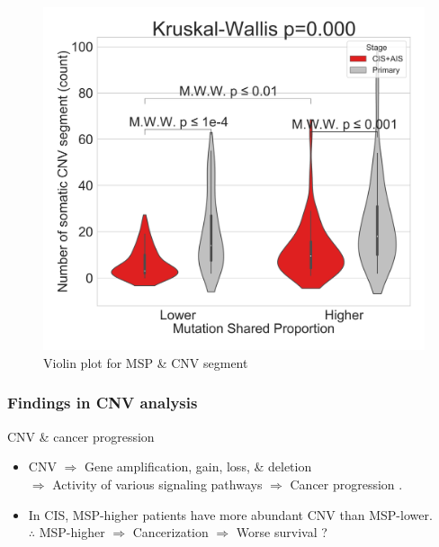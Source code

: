 \documentclass{beamer}
\begin{document}
\begin{frame}[allowframebreaks]
                    \begin{figure}
                        \includegraphics[width=0.4 \linewidth]{figures/MutationSharedProportion_CNV/Segment/Segment.BWA.Sequenza.SQC.median/Violin_Mutation Shared Proportion.pdf}
                        \caption{Violin plot for MSP \& CNV segment}
                    \end{figure}
                \end{frame}

            \begin{frame}
                \frametitle{Findings in CNV analysis}

                \begin{block}{CNV \& cancer progression}
                    \begin{itemize}
                        \item CNV $\Rightarrow$ Gene amplification, gain, loss, \& deletion \\
                            $\Rightarrow$ Activity of various signaling pathways $\Rightarrow$ Cancer progression \cite{copynumber-01, copynumber-02}.
                        \item In CIS, MSP-higher patients have more abundant CNV than MSP-lower. \\
                            $\therefore$ MSP-higher $\Rightarrow$ Cancerization $\Rightarrow$ Worse survival ?
                    \end{itemize}
                \end{block}
            \end{frame}
\end{document}
